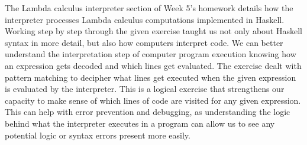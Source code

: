 \documentclass{article}
\theoremstyle{theorem}
\theoremstyle{definition}
\theoremstyle{remark}
\begin{document}
The Lambda calculus interpreter section of Week 5's homework details how the interpreter processes Lambda calculus computations implemented in Haskell. Working step by step through the given exercise taught us not only about Haskell syntax in more detail, but also how computers interpret code. We can better understand the interpretation step of computer program execution knowing how an expression gets decoded and which lines get evaluated. The exercise dealt with pattern matching to decipher what lines get executed when the given expression is evaluated by the interpreter. This is a logical exercise that strengthens our capacity to make sense of which lines of code are visited for any given expression. This can help with error prevention and debugging, as understanding the logic behind what the interpreter executes in a program can allow us to see any potential logic or syntax errors present more easily.  
\end{document}
